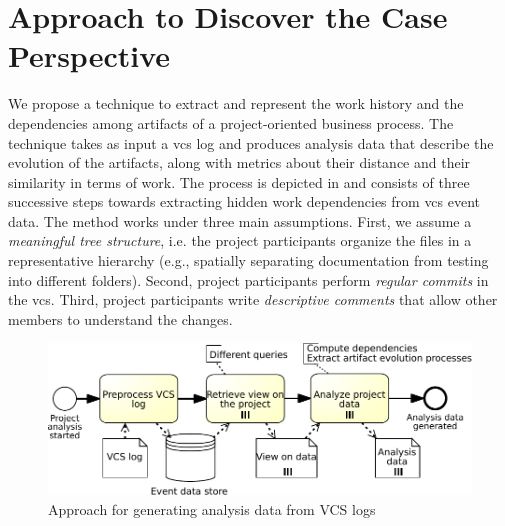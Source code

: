 \section{Approach to Discover the Case Perspective}
\label{sec:bpm2017approach}



We propose a technique to extract and represent the work history and the dependencies among artifacts of a project-oriented business process. The technique takes as input a \gls{vcs} log and produces analysis data that describe the evolution of the artifacts, along with metrics about their distance and their similarity in terms of work.
The process is depicted in  and consists of three successive steps towards extracting hidden work dependencies from \gls{vcs} event data. The method works under three main assumptions. First, we assume a \emph{meaningful tree structure}, i.e. the project participants organize the files in a representative hierarchy (e.g., spatially separating documentation from testing into different folders). Second, project participants perform \emph{regular commits} in the \gls{vcs}. Third, project participants write \emph{descriptive comments} that allow other members to understand the changes.

\begin{figure}[h]
	\centering
	\includegraphics[width=.7\textwidth]{bpm2017/figures/visualization-process-crop}
	\caption[Approach for generating analysis data from VCS logs]{Approach for generating analysis data from VCS logs}
	\label{fig:visualization-process}
\end{figure}

